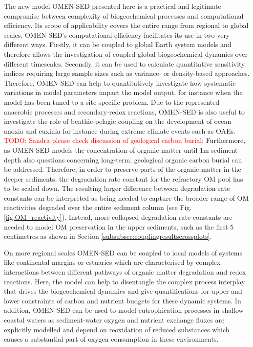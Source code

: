 \documentclass[gmd, manuscript]{copernicus}
\begin{document}
The new model OMEN-SED presented here is a practical and legitimate compromise between complexity of biogeochemical processes and computational efficiency. 
Its scope of applicability covers the entire range from regional to global scales. 
OMEN-SED's computational efficiency facilitates its use in two very different ways. Firstly, it can be coupled to global Earth system models and therefore allows the investigation of coupled global biogeochemical dynamics over different timescales. 
Secondly, it can be used to calculate quantitative sensitivity indices requiring large sample sizes such as variance- or density-based approaches. Therefore, OMEN-SED can help to quantitatively investigate how systematic variations in model parameters 
impact the model output, for instance when the model has been tuned to a site-specific problem. 
Due to the represented anaerobic processes and secondary-redox reactions, OMEN-SED is also useful to investigate the role of benthic-pelagic coupling on the development of ocean anoxia and euxinia for instance during extreme climate 
events such as OAEs. \textcolor{red}{TODO: Sandra please check discussion of geological carbon burial:} Furthermore, as OMEN-SED models the concentration of organic matter until 1m sediment depth also questions concerning long-term, geological organic 
carbon burial can be addressed. Therefore, in order to preserve parts of the organic matter in the deeper sediments, the degradation rate constant for the refractory OM pool has to be scaled down. 
The resulting larger difference between degradation rate constants can be interpreted as being needed to capture the broader range of OM reactivities degraded over the entire sediment column (see Fig. \ref{fig:OM_reactivity}). 
Instead, more collapsed degradation rate constants are needed to model OM preservation in the upper sediments, such as the first 5 centimetres as shown in Section \ref{subsubsec:couplingresultscrossplots}.

On more regional scales OMEN-SED can be coupled to local models of systems like continental margins or estuaries which are characterised by complex interactions between different pathways of organic matter degradation and redox reactions. 
Here, the model can help to disentangle the complex process interplay that drives the biogeochemical dynamics and give quantifications for upper and lower constraints of carbon and nutrient budgets for these dynamic systems. 
In addition, OMEN-SED can be used to model eutrophication processes in shallow coastal waters as sediment-water oxygen and nutrient exchange fluxes are explicitly modelled and depend on reoxidation of reduced substances which causes 
a substantial part of oxygen consumption in these environments. %
\end{document}
